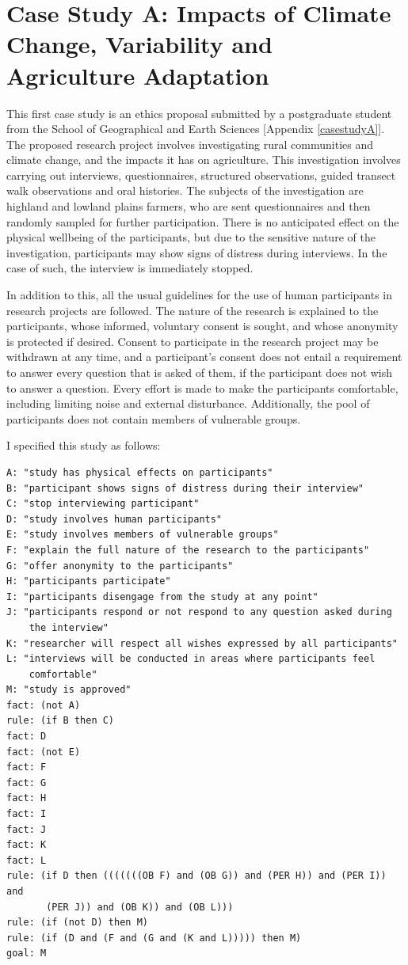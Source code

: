 \documentclass{l4proj}
\begin{document}
\section{Case Study A: Impacts of Climate Change, Variability and Agriculture Adaptation}

This first case study is an ethics proposal submitted by a postgraduate student from the School of Geographical and Earth Sciences [Appendix \ref{casestudyA}]. The proposed research project involves investigating rural communities and climate change, and the impacts it has on agriculture. This investigation involves carrying out interviews, questionnaires, structured observations, guided transect walk observations and oral histories. The subjects of the investigation are highland and lowland plains farmers, who are sent questionnaires and then randomly sampled for further participation. There is no anticipated effect on the physical wellbeing of the participants, but due to the sensitive nature of the investigation, participants may show signs of distress during interviews. In the case of such, the interview is immediately stopped. 

In addition to this, all the usual guidelines for the use of human participants in research projects are followed. The nature of the research is explained to the participants, whose informed, voluntary consent is sought, and whose anonymity is protected if desired. Consent to participate in the research project may be withdrawn at any time, and a participant's consent does not entail a requirement to answer every question that is asked of them, if the participant does not wish to answer a question. Every effort is made to make the participants comfortable, including limiting noise and external disturbance. Additionally, the pool of participants does not contain members of vulnerable groups. 

I specified this study as follows: 
\begin{verbatim}
A: "study has physical effects on participants"
B: "participant shows signs of distress during their interview"
C: "stop interviewing participant"
D: "study involves human participants"
E: "study involves members of vulnerable groups"
F: "explain the full nature of the research to the participants"
G: "offer anonymity to the participants"
H: "participants participate"
I: "participants disengage from the study at any point"
J: "participants respond or not respond to any question asked during 
    the interview"
K: "researcher will respect all wishes expressed by all participants"
L: "interviews will be conducted in areas where participants feel 
    comfortable"
M: "study is approved"
fact: (not A)
rule: (if B then C)
fact: D
fact: (not E)
fact: F
fact: G
fact: H
fact: I
fact: J 
fact: K
fact: L
rule: (if D then (((((((OB F) and (OB G)) and (PER H)) and (PER I)) and 
       (PER J)) and (OB K)) and (OB L)))
rule: (if (not D) then M)
rule: (if (D and (F and (G and (K and L))))) then M)
goal: M
\end{verbatim}
\end{document}
